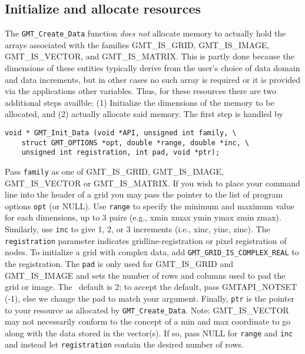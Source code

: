 \documentclass[11pt]{report}
\begin{document}

\subsection{Initialize and allocate resources}

The \texttt{GMT\_Create\_Data} function \emph{does not} allocate memory to actually hold
the arrays associated with the families GMT\_IS\_GRID, GMT\_IS\_IMAGE, GMT\_IS\_VECTOR,
and GMT\_IS\_MATRIX.  This is partly done because the dimensions of these entities typically
derive from the user's choice of data domain and data increments, but in other cases no such
array is required or it is provided via the applications other variables.  Thus, for these
resources there are two additional steps availble: (1) Initialize the dimensions of the memory
to be allocated, and (2) actually allocate said memory.  The first step is handled by 


\begin{verbatim}
void * GMT_Init_Data (void *API, unsigned int family, \
    struct GMT_OPTIONS *opt, double *range, double *inc, \
    unsigned int registration, int pad, void *ptr);
\end{verbatim}
Pass \texttt{family} as one of GMT\_IS\_GRID, GMT\_IS\_IMAGE, GMT\_IS\_VECTOR or GMT\_IS\_MATRIX.
If you wish to place your command line into the header of a grid you may pass the pointer to the list
of program options \texttt{opt} (or NULL).  Use \texttt{range} to specify the minimum and maximum
value for each dimensions, up to 3 pairs (e.g., xmin xmax ymin ymax zmin zmax). Similarly, use
\texttt{inc} to give 1, 2, or 3 increments (i.e., xinc, yinc, zinc).  The
\texttt{registration} parameter indicates gridline-registration or pixel registration of nodes.
To initialize a grid with complex data, add \texttt{GMT\_GRID\_IS\_COMPLEX\_REAL} to the registration.
The \texttt{pad} is only used for GMT\_IS\_GRID and GMT\_IS\_IMAGE and sets the number of
rows and columns used to pad the grid or image.  The \GMT\ default is 2; to accept the default,
pass GMTAPI\_NOTSET (-1), else we change the pad to match your argument.
Finally, \texttt{ptr} is the pointer to your resource as allocated by \texttt{GMT\_Create\_Data}.
Note: GMT\_IS\_VECTOR may not necessarily conform to the concept of a min and max coordinate to go
along with the data stored in the vector(s).  If so, pass NULL for \texttt{range} and \texttt{inc}
and instead let \texttt{registration} contain the desired number of rows.
\end{document}
